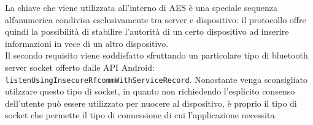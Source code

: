 La chiave che viene utilizzata all'interno di AES è una speciale sequenza alfanumerica condivisa esclusivamente tra server e dispositivo: il protocollo offre quindi la possibilità di stabilire l'autorità di un certo dispositivo ad inserire informazioni in vece di un altro dispositivo.\\

Il secondo requisito viene soddisfatto sfruttando un particolare tipo di bluetooth server socket offerto dalle API Android: \texttt{listenUsingInsecureRfcommWithServiceRecord}. Nonostante venga sconsigliato utilzzare questo tipo di socket, in quanto non richiedendo l'esplicito consenso dell'utente può essere utilizzato per nuocere al dispositivo, è proprio il tipo di socket che permette il tipo di connessione di cui l'applicazione necessita.

